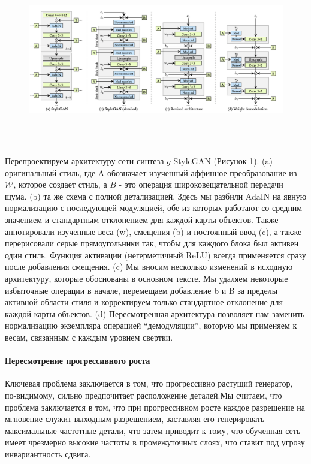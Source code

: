 \begin{figure}
    \centering
    \includegraphics[height=75mm]{fig/stylegan2_scheme.png}
    \caption{}
    \label{fig.stylegan2_scheme}
\end{figure}
Перепроектируем архитектуру сети синтеза $g$ StyleGAN (Рисунок {\color{blue} \ref{fig.stylegan2_scheme}}). (a) оригинальный стиль, где A обозначает изученный
аффинное преобразование из $\mathcal{W}$, которое создает стиль, а $B$ - это операция широковещательной передачи шума. (b) та же схема с полной детализацией. Здесь мы разбили AdaIN на явную нормализацию с последующей модуляцией, обе из которых работают со средним значением и стандартным отклонением для каждой карты объектов. Также аннотировали изученные веса (w), смещения (b) и постоянный ввод (c), а также перерисовали серые прямоугольники так, чтобы для каждого блока был активен один стиль. Функция активации (негерметичный ReLU) всегда применяется сразу после добавления смещения. (c) Мы вносим несколько изменений в исходную архитектуру, которые обоснованы в основном тексте. Мы удаляем некоторые избыточные операции в начале, перемещаем добавление b и B за пределы активной области стиля и корректируем только стандартное отклонение для каждой карты объектов. (d) Пересмотренная архитектура позволяет нам заменить нормализацию экземпляра операцией “демодуляции”, которую мы применяем к весам, связанным с каждым уровнем свертки\cite{StyleGAN2}.

\paragraph{Пересмотрение прогрессивного роста}

Ключевая проблема заключается в том, что прогрессивно растущий генератор, по-видимому, сильно предпочитает расположение деталей.Мы считаем, что проблема заключается в том, что при прогрессивном росте каждое разрешение на мгновение служит выходным разрешением, заставляя его генерировать максимальные частотные детали, что затем приводит к тому, что обученная сеть имеет чрезмерно высокие частоты в промежуточных слоях, что ставит под угрозу инвариантность сдвига\cite{shift_invariant_networks}.

